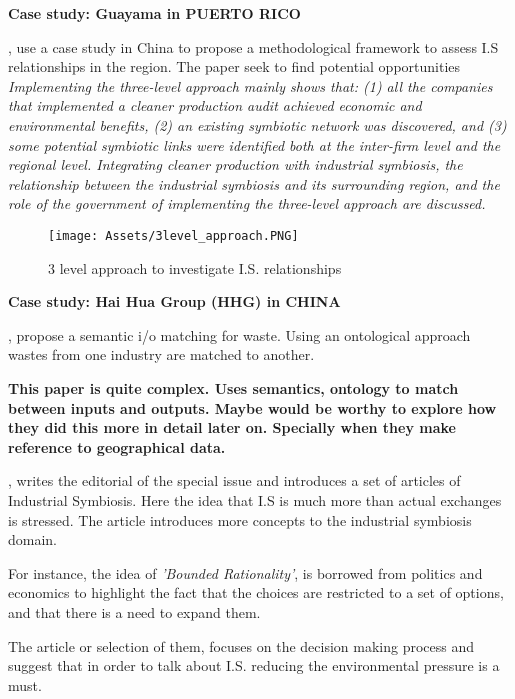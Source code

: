 \textbf{Case study: Guayama in PUERTO RICO}



\textbf{}\par
\textcite{Liu2015}, use a case study in China to propose a methodological framework to assess I.S relationships in the region. The paper seek to find potential opportunities
\textit{Implementing the three-level approach mainly shows that: (1) all the companies that implemented a cleaner production audit achieved economic and environmental benefits, (2) an existing symbiotic network was discovered, and (3) some potential symbiotic links were identified both at the inter-firm level and the regional level. Integrating cleaner production with industrial symbiosis, the relationship between the industrial symbiosis and its surrounding region, and the role of the government of implementing the three-level approach are discussed.}



\begin{figure}[h!]
    \centering
    \texttt{[image: Assets/3level\_approach.PNG]}
    \caption{3 level approach to investigate I.S. relationships}
    \label{fig:3-stage approach}
\end{figure}

\textbf{Case study: Hai Hua Group (HHG) in CHINA}

\textbf{}\par
\textcite{Trokanas2014}, propose a semantic i/o matching for waste. Using an ontological approach wastes from one industry are matched to another. 

\textbf{This paper is quite complex. Uses semantics, ontology to match between inputs and outputs. Maybe would be worthy to explore how they did this more in detail later on. Specially when they make reference to geographical data.}




\textbf{}\par
\textcite{Posch2011}, writes the editorial of the special issue and introduces a set of articles of Industrial Symbiosis. Here the idea that I.S is much more than actual exchanges is stressed. The article introduces more concepts to the industrial symbiosis domain. \par
For instance, the idea of \textit{'Bounded Rationality'}, is borrowed from politics and economics to highlight the fact that the choices are restricted to a set of options, and that there is a need to expand them. \par
The article or selection of them, focuses on the decision making process and suggest that in order to talk about I.S. reducing the environmental pressure is a must.



